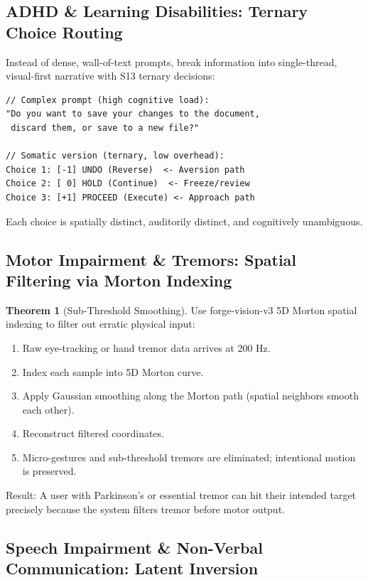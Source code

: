 \documentclass[11pt,oneside]{article}
\theoremstyle{definition}
\newtheorem{theorem}{Theorem}
\begin{document}
\subsection{ADHD \& Learning Disabilities: Ternary Choice Routing}

Instead of dense, wall-of-text prompts, break information into single-thread, visual-first narrative with S13 ternary decisions:

\begin{lstlisting}
// Complex prompt (high cognitive load):
"Do you want to save your changes to the document,
 discard them, or save to a new file?"

// Somatic version (ternary, low overhead):
Choice 1: [-1] UNDO (Reverse)  <- Aversion path
Choice 2: [ 0] HOLD (Continue)  <- Freeze/review
Choice 3: [+1] PROCEED (Execute) <- Approach path
\end{lstlisting}

Each choice is spatially distinct, auditorily distinct, and cognitively unambiguous.

\subsection{Motor Impairment \& Tremors: Spatial Filtering via Morton Indexing}

\begin{theorem}[Sub-Threshold Smoothing]
Use forge-vision-v3 5D Morton spatial indexing to filter out erratic physical input:

\begin{enumerate}
  \item Raw eye-tracking or hand tremor data arrives at 200 Hz.
  \item Index each sample into 5D Morton curve.
  \item Apply Gaussian smoothing along the Morton path (spatial neighbors smooth each other).
  \item Reconstruct filtered coordinates.
  \item Micro-gestures and sub-threshold tremors are eliminated; intentional motion is preserved.
\end{enumerate}

Result: A user with Parkinson's or essential tremor can hit their intended target precisely because the system filters tremor before motor output.
\end{theorem}

\subsection{Speech Impairment \& Non-Verbal Communication: Latent Inversion}
\end{document}
